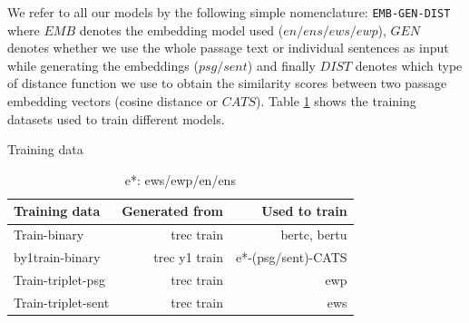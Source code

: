 We refer to all our models by the following simple nomenclature: \texttt{EMB-GEN-DIST} where $EMB$ denotes the embedding model used ($en/ens/ews/ewp$), $GEN$ denotes whether we use the whole passage text or individual sentences as input while generating the embeddings ($psg/sent$) and finally $DIST$ denotes which type of distance function we use to obtain the similarity scores between two passage embedding vectors (cosine distance or $CATS$). Table \ref{tab:dat} shows the training datasets used to train different models.

\begin{small}
\begin{table}[t]
\centering
\caption{Training data}
\label{tab:dat}
\begin{tabular}{@{}lrr@{}}\toprule
Training data & Generated from & Used to train \\\midrule
Train-binary & trec train & bertc, bertu \\
by1train-binary & trec y1 train & e*-(psg/sent)-CATS \\
Train-triplet-psg & trec train & ewp \\
Train-triplet-sent & trec train & ews \\
\bottomrule
\end{tabular}
\caption*{e*: ews/ewp/en/ens \\}
\end{table}
\end{small}


